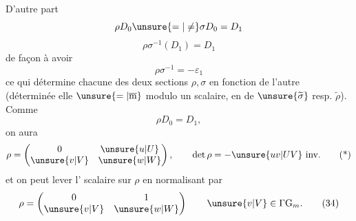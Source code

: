 D'autre part 
\[
\rho D_0\unsure{=|\ne}\sigma D_0=D_1
\]
 
\[
\rho\sigma^{-1}(D_1)=D_1
\]
de façon à avoir
\[
\boxed{\rho\sigma^{-1}=-\varepsilon_1}
\tag{33}
\]
ce qui détermine chacune des deux sections $\rho,\sigma$ en fonction de l'autre
(déterminée elle $\unsure{=|\overline{\mathrm m}}$ modulo un scalaire,
en  
de $\unsure{\widetilde\sigma}$ resp.  $\widetilde\rho$).
Comme
\[
\rho D_0=D_1,
\]
on aura
\[
\rho=\begin{pmatrix}0&\unsure{u|U}\\\unsure{v|V}&\unsure{w|W}\end{pmatrix},
\qquad \det\rho=-\unsure{uv|UV}\ \text{inv.}
\tag{*}
\]
et on peut lever l' scalaire sur $\rho$
en  normalisant par
\[
\rho=\begin{pmatrix}0&1\\\unsure{v|V}&\unsure{w|W}\end{pmatrix}
\qquad \unsure{v|V}\in\Gamma\mathrm G_m.
\tag{34}
\]

